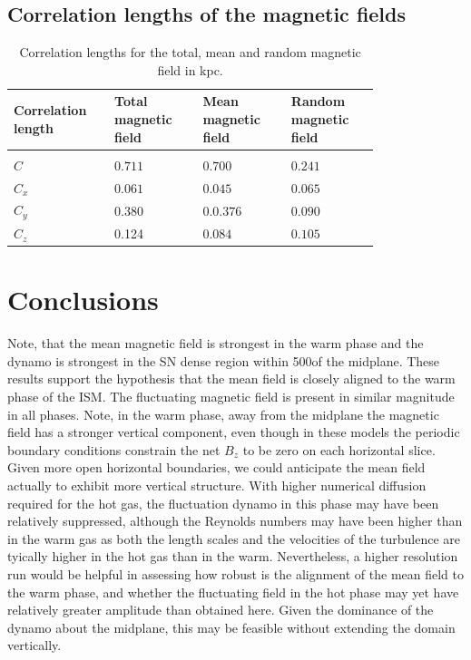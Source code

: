 \documentclass[useAMS,usenatbib]{mn2e}
\begin{document}
\subsection{Correlation lengths of the magnetic fields}
\begin{table}[H]
 \centering
  \caption{Correlation lengths for the total, mean and random magnetic field in kpc.}
  \label{table:mean_probs}
\begin{tabular*}{\linewidth}{p{0.20\linewidth}p{0.20\linewidth}p{0.2\linewidth}p{0.2\linewidth}@{}}
  \hline
Correlation length &Total magnetic field& Mean magnetic field& Random magnetic field \\
 \hline
\\
$C$&$0.711$&$0.700$&$0.241$ \\
$C_x$& $0.061$&$0.045$&$0.065$   \\
$C_y$&$0.380$ & $0.0.376$&$0.090$    \\
$C_z$&0.124&$0.084$&$0.105$\\
\hline
\end{tabular*}
\end{table}


 
\section{Conclusions}
Note, that the mean magnetic field is strongest in the warm phase and the 
dynamo is strongest in the SN dense region within 500\pc of the midplane. 
These results support the hypothesis that the mean field is closely aligned to 
the warm phase of the ISM.
The fluctuating magnetic field is present in similar magnitude in all phases.
Note, in the warm phase, away from the midplane the magnetic field has a 
stronger vertical component, even though in these models the periodic boundary
conditions constrain the net $B_z$ to be zero on each horizontal slice. 
Given more open horizontal boundaries, we could anticipate the mean field 
actually to exhibit more vertical structure. 
With higher numerical diffusion required for the hot gas, the fluctuation 
dynamo in this phase may have been relatively suppressed, although the 
Reynolds numbers may have been higher than in the warm gas as both the length
scales and the velocities of the turbulence are tyically higher in the hot gas
than in the warm.
Nevertheless, a higher resolution run would be helpful in assessing how robust
is the alignment of the mean field to the warm phase, and whether the
fluctuating field in the hot phase may yet have relatively greater amplitude
than obtained here.
Given the dominance of the dynamo about the midplane, this may be feasible
without extending the domain vertically.
\end{document}
